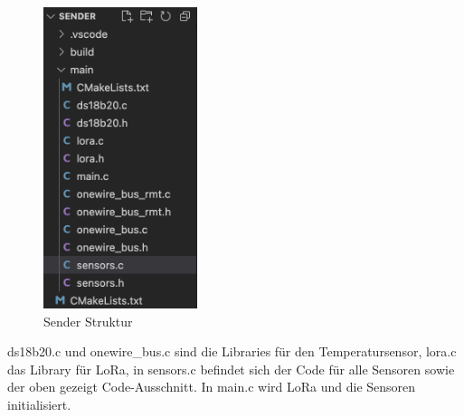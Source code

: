 \begin{figure}[h]
  \centering
  \includegraphics[width=0.4\textwidth]{./pics/Sender Struktur.png}
  \caption{Sender Struktur}
  \label{fig:Sender Datei-Struktur}
\end{figure}

ds18b20.c und onewire\_bus.c sind die Libraries für den Temperatursensor, lora.c das Library für LoRa, in sensors.c befindet sich der Code für alle Sensoren
sowie der oben gezeigt Code-Ausschnitt. In main.c wird LoRa und die Sensoren initialisiert. 